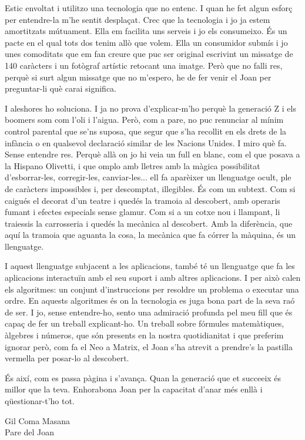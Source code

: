 Estic envoltat i utilitzo una tecnologia que no entenc. I quan he fet algun esforç per entendre-la m'he sentit desplaçat. Crec que la tecnologia i jo ja estem amortitzats mútuament. Ella em facilita uns serveis i jo els consumeixo. És un pacte en el qual tots dos tenim allò que volem. Ella un consumidor submís i jo unes comoditats que em fan creure que puc ser original escrivint un missatge de 140 caràcters i un fotògraf artístic retocant una imatge. Però que no falli res, perquè si surt algun missatge que no m'espero, he de fer venir el Joan per preguntar-li què carai significa.

I aleshores ho soluciona. I ja no prova d'explicar-m'ho perquè la generació Z i els boomers som com l'oli i l'aigua. Però, com a pare, no puc renunciar al mínim control parental que se'ns suposa, que segur que s'ha recollit en els drets de la infància o en qualsevol declaració similar de les Nacions Unides. I miro què fa. Sense entendre res. Perquè allà on jo hi veia un full en blanc, com el que posava a la Hispano Olivetti, i que omplo amb lletres amb la màgica possibilitat d'esborrar-les, corregir-les, canviar-les... ell fa aparèixer un llenguatge ocult, ple de caràcters impossibles i, per descomptat, illegibles. És com un subtext. Com si caigués el decorat d'un teatre i quedés la tramoia al descobert, amb operaris fumant i efectes especials sense glamur. Com si a un cotxe nou i llampant, li traiessis la carrosseria i quedés la mecànica al descobert. Amb la diferència, que aquí la tramoia que aguanta la cosa, la mecànica que fa córrer la màquina, és un llenguatge.

I aquest llenguatge subjacent a les aplicacions, també té un llenguatge que fa les aplicacions interactuïn amb el seu suport i amb altres aplicacions. I per això calen els algoritmes: un conjunt d'instruccions per resoldre un problema o executar una ordre. En aquests algoritmes és on la tecnologia es juga bona part de la seva raó de ser. I jo, sense entendre-ho, sento una admiració profunda pel meu fill que és capaç de fer un treball explicant-ho. Un treball sobre fórmules matemàtiques, àlgebres i números, que són presents en la nostra quotidianitat i que preferim ignorar però, com fa el Neo a Matrix, el Joan s'ha atrevit a prendre's la pastilla vermella per posar-lo al descobert. 

És així, com es passa pàgina i s'avança. Quan la generació que et succeeix és millor que la teva. Enhorabona Joan per la capacitat d'anar més enllà i qüestionar-t'ho tot.

\begin{flushright}
	Gil Coma Masana \\ Pare del Joan
\end{flushright}